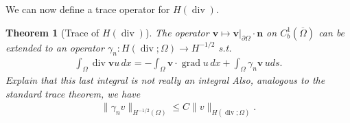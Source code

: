 \documentclass[12pt,a4paper]{article}
\numberwithin{equation}{subsection}
\numberwithin{lemma}{subsection}
\newtheorem{theorem}[lemma]{Theorem}
\theoremstyle{definition}
\DeclareMathOperator{\diver}{div}
\DeclareMathOperator{\grad}{grad}
\begin{document}
We can now define a trace operator for $H(\diver)$.
\begin{theorem}[Trace of $H(\diver)$]\label{thm:trace_of_hdiv}
    The operator $\mathbf{v} \mapsto \mathbf{v}|_{\partial \Omega} \cdot \mathbf{n}$
    on $C^1_b(\overline{\Omega})$ can be extended to an operator 
    $\gamma_n: H(\diver;\Omega) \rightarrow H^{-1/2}$ s.t.
    \begin{align*}
        \int_\Omega \diver \mathbf{v} u \, dx 
        = -\int_\Omega \mathbf{v} \cdot \grad u \, dx + \int_\Omega \gamma_n \mathbf{v} \, u ds.
    \end{align*}
    {\color{red}Explain that this last integral is not really an integral}
    Also, analogous to the standard trace theorem, we have
    \begin{align*}
        \lVert \gamma_n v \rVert _{H^{-1/2}(\Omega)} 
        \leq C \lVert v \rVert _{H(\diver; \Omega)}.
    \end{align*}
\end{theorem}
\end{document}
